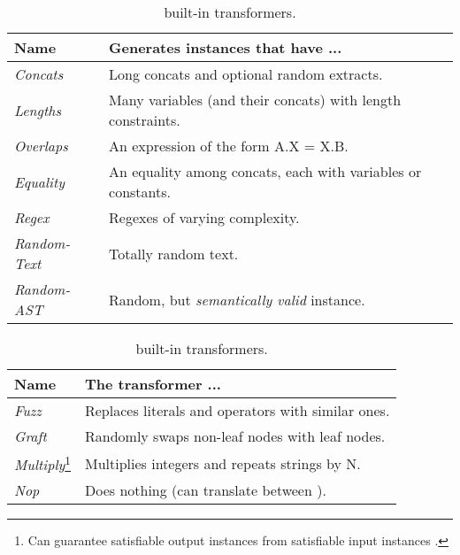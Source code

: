 \begin{table}[t]
    \caption{\fuzzer{} built-in (a) generators and (b) transformers.}
    \begin{subtable}{1\textwidth}
        \centering
        \caption{\generator{} built-in generators.}
        \label{tbl:generators}
        \begin{tabular}{ l l }
            \toprule
            \textbf{Name}
            & \textbf{Generates instances that have ...} \\
            \midrule
            \textit{Concats}
            & Long concats and optional random extracts. \\
            \textit{Lengths}
            & Many variables (and their concats) with length constraints. \\
            \textit{Overlaps}
            & An expression of the form A.X = X.B. \\
            \textit{Equality}
            & An equality among concats, each with variables or constants. \\
            \textit{Regex}
            & Regexes of varying complexity. \\
            \textit{Random-Text}
            & Totally random text. \\
            \textit{Random-AST}
            & Random, but \textit{semantically valid} instance. \\
            \bottomrule
        \end{tabular}
    \end{subtable}
    \begin{subtable}{1\textwidth}
        \centering
        \caption{\transformer{} built-in transformers.}
        \label{tbl:transformers}
        \begin{tabular}{l l}
            \toprule
            \textbf{Name}
            & \textbf{The transformer ...} \\
            \midrule
            \textit{Fuzz}
            & Replaces literals and operators with similar ones.\\
            \textit{Graft}
            & Randomly swaps non-leaf nodes with leaf nodes.\\
            \textit{Multiply}\footnote{Can guarantee satisfiable output
            instances from satisfiable input instances \cite{website}.}
            & Multiplies integers and repeats strings by N.\\
            \textit{Nop}
            & Does nothing (can translate between \smtfull{}).\\

\end{tabular}
\end{subtable}
\end{table}
